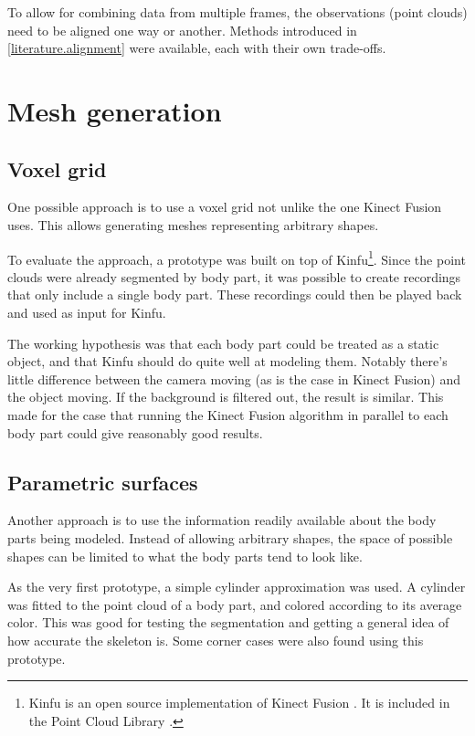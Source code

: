 To allow for combining data from multiple frames, the observations (point clouds) need to be aligned one way or another. Methods introduced in \autoref{literature.alignment} were available, each with their own trade-offs.


\section{Mesh generation}


\subsection{Voxel grid}

One possible approach is to use a voxel grid not unlike the one Kinect Fusion \citep{} uses. This allows generating meshes representing arbitrary shapes.

To evaluate the approach, a prototype was built on top of Kinfu\footnote{Kinfu is an open source implementation of Kinect Fusion \citep{newcombe2011kinectfusion
}. It is included in the Point Cloud Library \citep{PCL}.}. Since the point clouds were already segmented by body part, it was possible to create recordings that only include a single body part. These recordings could then be played back and used as input for Kinfu.

The working hypothesis was that each body part could be treated as a static object, and that Kinfu should do quite well at modeling them. Notably there's little difference between the camera moving (as is the case in Kinect Fusion) and the object moving. If the background is filtered out, the result is similar. This made for the case that running the Kinect Fusion algorithm in parallel to each body part could give reasonably good results.

\subsection{Parametric surfaces}

Another approach is to use the information readily available about the body parts being modeled. Instead of allowing arbitrary shapes, the space of possible shapes can be limited to what the body parts tend to look like.

As the very first prototype, a simple cylinder approximation was used. A cylinder was fitted to the point cloud of a body part, and colored according to its average color. This was good for testing the segmentation and getting a general idea of how accurate the skeleton is. Some corner cases were also found using this prototype.

